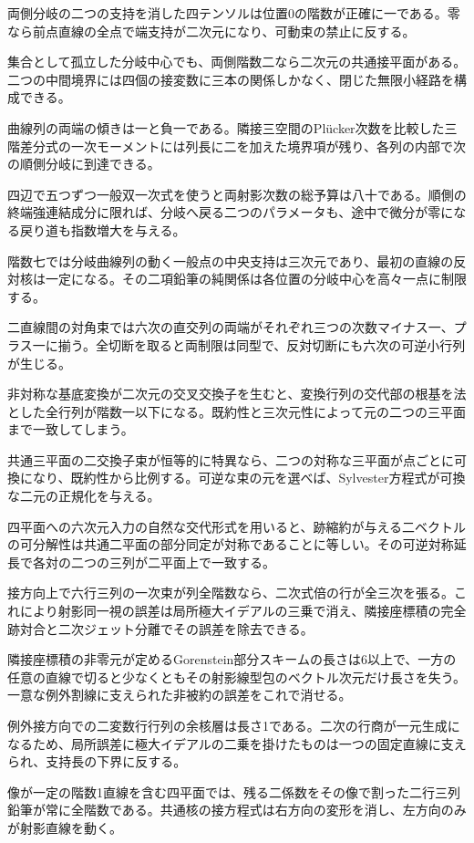\documentclass[11pt,a4paper]{ltjsarticle}
\begin{document}
両側分岐の二つの支持を消した四テンソルは位置0の階数が正確に一である。零なら前点直線の全点で端支持が二次元になり、可動束の禁止に反する。

集合として孤立した分岐中心でも、両側階数二なら二次元の共通接平面がある。二つの中間境界には四個の接変数に三本の関係しかなく、閉じた無限小経路を構成できる。

曲線列の両端の傾きは一と負一である。隣接三空間のPlücker次数を比較した三階差分式の一次モーメントには列長に二を加えた境界項が残り、各列の内部で次の順側分岐に到達できる。

四辺で五つずつ一般双一次式を使うと両射影次数の総予算は八十である。順側の終端強連結成分に限れば、分岐へ戻る二つのパラメータも、途中で微分が零になる戻り道も指数増大を与える。

階数七では分岐曲線列の動く一般点の中央支持は三次元であり、最初の直線の反対核は一定になる。その二項鉛筆の純関係は各位置の分岐中心を高々一点に制限する。

二直線間の対角束では六次の直交列の両端がそれぞれ三つの次数マイナス一、プラス一に揃う。全切断を取ると両制限は同型で、反対切断にも六次の可逆小行列が生じる。

非対称な基底変換が二次元の交叉交換子を生むと、変換行列の交代部の根基を法とした全行列が階数一以下になる。既約性と三次元性によって元の二つの三平面まで一致してしまう。

共通三平面の二交換子束が恒等的に特異なら、二つの対称な三平面が点ごとに可換になり、既約性から比例する。可逆な束の元を選べば、Sylvester方程式が可換な二元の正規化を与える。

四平面への六次元入力の自然な交代形式を用いると、跡縮約が与える二ベクトルの可分解性は共通二平面の部分同定が対称であることに等しい。その可逆対称延長で各対の二つの三列が二平面上で一致する。

接方向上で六行三列の一次束が列全階数なら、二次式倍の行が全三次を張る。これにより射影同一視の誤差は局所極大イデアルの三乗で消え、隣接座標積の完全跡対合と二次ジェット分離でその誤差を除去できる。

隣接座標積の非零元が定めるGorenstein部分スキームの長さは6以上で、一方の任意の直線で切ると少なくともその射影線型包のベクトル次元だけ長さを失う。一意な例外割線に支えられた非被約の誤差をこれで消せる。

例外接方向での二変数行行列の余核層は長さ1である。二次の行商が一元生成になるため、局所誤差に極大イデアルの二乗を掛けたものは一つの固定直線に支えられ、支持長の下界に反する。

像が一定の階数1直線を含む四平面では、残る二係数をその像で割った二行三列鉛筆が常に全階数である。共通核の接方程式は右方向の変形を消し、左方向のみが射影直線を動く。
\end{document}
